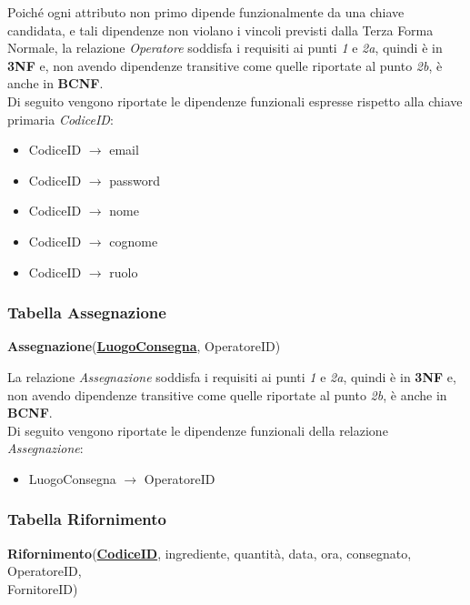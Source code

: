 \documentclass[12pt,a4paper]{article}
\begin{document}
    \vspace{8pt}
    \noindent
    Poiché ogni attributo non primo dipende funzionalmente da una chiave candidata, e tali dipendenze non violano i vincoli previsti dalla Terza Forma Normale, la relazione \textit{Operatore} soddisfa i requisiti ai punti \textit{1} e \textit{2a}, quindi è in \textbf{3NF} e, non avendo dipendenze transitive come quelle riportate al punto \textit{2b}, è anche in \textbf{BCNF}.\\
    Di seguito vengono riportate le dipendenze funzionali espresse rispetto alla chiave primaria \textit{CodiceID}:
    \begin{itemize}[leftmargin=1em, label=$\circ$]
        \item CodiceID $\rightarrow$ email
        \item CodiceID $\rightarrow$ password
        \item CodiceID $\rightarrow$ nome
        \item CodiceID $\rightarrow$ cognome
        \item CodiceID $\rightarrow$ ruolo
    \end{itemize}
    

    \subsubsection*{Tabella Assegnazione}
    \begin{tcolorbox}[
        colback=gray!8,
        colframe=black!30,
        title=
    ]
        \textbf{Assegnazione}(\textbf{\uline{LuogoConsegna}}, OperatoreID)
    \end{tcolorbox}

    \noindent
    La relazione \textit{Assegnazione} soddisfa i requisiti ai punti \textit{1} e \textit{2a}, quindi è in \textbf{3NF} e, non avendo dipendenze transitive come quelle riportate al punto \textit{2b}, è anche in \textbf{BCNF}.\\
    Di seguito vengono riportate le dipendenze funzionali della relazione \textit{Assegnazione}:
    \begin{itemize}[leftmargin=1em, label=$\circ$]
        \item LuogoConsegna $\rightarrow$ OperatoreID
    \end{itemize}


    \subsubsection*{Tabella Rifornimento}     
    \begin{tcolorbox}[
        colback=gray!8,
        colframe=black!30,
        title=
    ]
        \textbf{Rifornimento}(\textbf{\uline{CodiceID}}, ingrediente, quantità, data, ora, consegnato, OperatoreID, \\FornitoreID)
    \end{tcolorbox}
    
\end{document}
